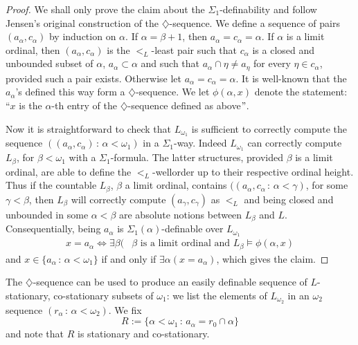 \documentclass[a4paper,12pt]{article}
\begin{document}
\begin{proof}
We shall only prove the claim about the $\Sigma_1$-definability and follow Jensen's original construction of the $\diamondsuit$-sequence. We define a sequence of pairs $(a_{\alpha}, c_{\alpha})$ by induction on $\alpha$. If $\alpha=\beta+1$, then $a_{\alpha}=c_{\alpha}=\alpha$. If $\alpha$ is a limit ordinal, then $(a_{\alpha},c_{\alpha})$ is the $<_L$-least pair such that $c_{\alpha}$ is a closed and unbounded subset of $\alpha$, $a_{\alpha} \subset \alpha$ and such that $a_{\alpha} \cap \eta \ne a_{\eta}$ for every $\eta \in c_{\alpha}$, provided such a pair exists. Otherwise let $a_{\alpha}= c_{\alpha}=\alpha$. It is well-known that the $a_{\alpha}$'s defined this way form a $\diamondsuit$-sequence. We let $\phi(\alpha,x)$ denote the statement: ``$x$ is the $\alpha$-th entry of the $\diamondsuit$-sequence defined as above$"$.

Now it is straightforward to check that $L_{\omega_1}$ is sufficient to correctly compute the sequence $((a_{\alpha},c_{\alpha}) \, : \, \alpha < \omega_1)$ in a $\Sigma_1$-way.
Indeed $L_{\omega_1}$ can correctly compute $L_{\beta}$, for $\beta < \omega_1$ with a $\Sigma_1$-formula. The latter structures, provided $\beta$ is a limit ordinal, are able to define the $<_L$-wellorder up to their respective ordinal height. Thus if the countable $L_{\beta}$, $\beta$ a limit ordinal, contains $((a_{\alpha},c_{\alpha} \, : \, \alpha < \gamma)$, for some $\gamma < \beta$, then $L_{\beta}$ will correctly compute $(a_{\gamma},c_{\gamma})$ as $<_L$ and being closed and unbounded in some $\alpha<\beta$ are absolute notions between $L_{\beta}$ and $L$. Consequentially, being $a_{\alpha}$ is  $\Sigma_1(\alpha)$-definable over $L_{\omega_1}$
\begin{align*}
x= a_{\alpha} \Leftrightarrow \exists \beta (& \beta \text{ is a limit ordinal and }
L_{\beta} \models \phi(\alpha,x)
\end{align*}
and $x \in \{ a_{\alpha} \, : \, \alpha < \omega_1\}$ if and only if $\exists \alpha (x=a_{\alpha})$, which gives the claim.
\end{proof}
 
The $\diamondsuit$-sequence can be used to produce an easily definable sequence of $L$-stationary, co-stationary subsets of $\omega_1$: we list the elements of $L_{\omega_2}$ in an $\omega_2$ sequence $(r_{\alpha} \, : \, \alpha < \omega_2)$. 
We fix \[R:= \{\alpha < \omega_1 \, : \, a_{\alpha}= r_0 \cap \alpha \} \] and note that $R$ is stationary and co-stationary. 
\end{document}
